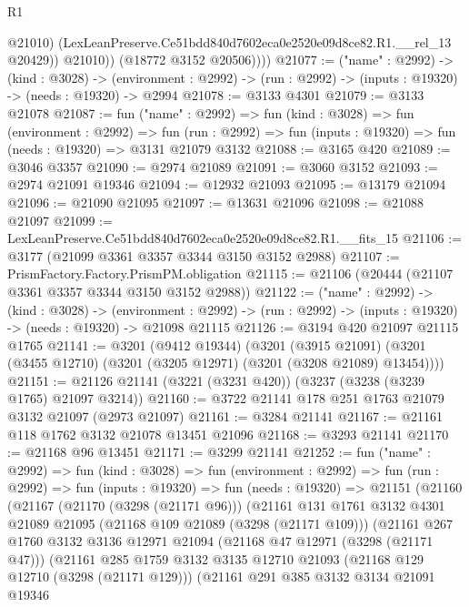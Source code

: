 \begin{lexlean}{R1}
\begin{coremodule}
                  @21010)
                (LexLeanPreserve.Ce51bdd840d7602eca0e2520e09d8ce82.R1.__rel_13 @20429))
              @21010))
          (@18772 @3152 @20506))))
@21077 := ("name" : @2992) ->
  (kind : @3028) ->
  (environment : @2992) -> (run : @2992) -> (inputs : @19320) -> (needs : @19320) -> @2994
@21078 := @3133 @4301
@21079 := @3133 @21078
@21087 := fun ("name" : @2992) =>
  fun (kind : @3028) =>
  fun (environment : @2992) =>
  fun (run : @2992) => fun (inputs : @19320) => fun (needs : @19320) => @3131 @21079 @3132
@21088 := @3165 @420
@21089 := @3046 @3357
@21090 := @2974 @21089
@21091 := @3060 @3152
@21093 := @2974 @21091 @19346
@21094 := @12932 @21093
@21095 := @13179 @21094
@21096 := @21090 @21095
@21097 := @13631 @21096
@21098 := @21088 @21097
@21099 := LexLeanPreserve.Ce51bdd840d7602eca0e2520e09d8ce82.R1.__fits_15
@21106 := @3177 (@21099 @3361 @3357 @3344 @3150 @3152 @2988)
@21107 := PrismFactory.Factory.PrismPM.obligation
@21115 := @21106 (@20444 (@21107 @3361 @3357 @3344 @3150 @3152 @2988))
@21122 := ("name" : @2992) ->
  (kind : @3028) ->
  (environment : @2992) -> (run : @2992) -> (inputs : @19320) -> (needs : @19320) -> @21098 @21115
@21126 := @3194 @420 @21097 @21115 @1765
@21141 := @3201
    (@9412 @19344)
    (@3201
      (@3915 @21091)
      (@3201 (@3455 @12710) (@3201 (@3205 @12971) (@3201 (@3208 @21089) @13454))))
@21151 := @21126 @21141 (@3221 (@3231 @420)) (@3237 (@3238 (@3239 @1765) @21097 @3214))
@21160 := @3722 @21141 @178 @251 @1763 @21079 @3132 @21097 (@2973 @21097)
@21161 := @3284 @21141
@21167 := @21161 @118 @1762 @3132 @21078 @13451 @21096
@21168 := @3293 @21141
@21170 := @21168 @96 @13451
@21171 := @3299 @21141
@21252 := fun ("name" : @2992) =>
  fun (kind : @3028) =>
  fun (environment : @2992) =>
  fun (run : @2992) =>
  fun (inputs : @19320) =>
  fun (needs : @19320) =>
  @21151
    (@21160
      (@21167
        (@21170 (@3298 (@21171 @96)))
        (@21161
          @131
          @1761
          @3132
          @4301
          @21089
          @21095
          (@21168 @109 @21089 (@3298 (@21171 @109)))
          (@21161
            @267
            @1760
            @3132
            @3136
            @12971
            @21094
            (@21168 @47 @12971 (@3298 (@21171 @47)))
            (@21161
              @285
              @1759
              @3132
              @3135
              @12710
              @21093
              (@21168 @129 @12710 (@3298 (@21171 @129)))
              (@21161
                @291
                @385
                @3132
                @3134
                @21091
                @19346

\end{coremodule}
\end{lexlean}
